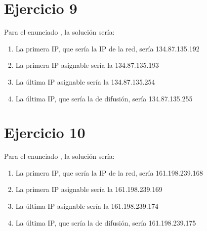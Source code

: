 \documentclass[letterpaper,10pt,spanish]{sphinxmanual}
\begin{document}
\section{Ejercicio 9}
\label{\detokenize{t2_integracion_elementos/ejercicios_subredes_ipv4/rangos_direcciones:id9}}
\sphinxAtStartPar
Para el enunciado , la solución sería:
\begin{enumerate}
%
\item {} 
\sphinxAtStartPar
La primera IP, que sería la IP de la red, sería 134.87.135.192

\item {} 
\sphinxAtStartPar
La primera IP asignable sería la 134.87.135.193

\item {} 
\sphinxAtStartPar
La última IP asignable sería la 134.87.135.254

\item {} 
\sphinxAtStartPar
La última IP, que sería la de difusión, sería 134.87.135.255

\end{enumerate}


\section{Ejercicio 10}
\label{\detokenize{t2_integracion_elementos/ejercicios_subredes_ipv4/rangos_direcciones:id10}}
\sphinxAtStartPar
Para el enunciado , la solución sería:
\begin{enumerate}
%
\item {} 
\sphinxAtStartPar
La primera IP, que sería la IP de la red, sería 161.198.239.168

\item {} 
\sphinxAtStartPar
La primera IP asignable sería la 161.198.239.169

\item {} 
\sphinxAtStartPar
La última IP asignable sería la 161.198.239.174

\item {} 
\sphinxAtStartPar
La última IP, que sería la de difusión, sería 161.198.239.175

\end{enumerate}
\end{document}

